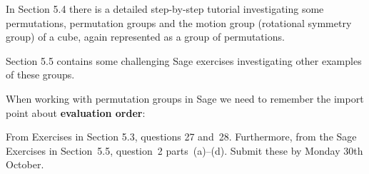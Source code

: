 \documentclass[oneside,10pt]{amsart}
\begin{document}
In Section 5.4 there is a detailed step-by-step tutorial investigating some permutations, permutation groups and the motion group (rotational symmetry group) of a cube, again represented as a group of permutations.

Section 5.5 contains some challenging Sage exercises investigating other examples of these groups.

When working with permutation groups in Sage we need to remember the import point about \textbf{evaluation order}:

\smallskip



From Exercises in Section 5.3, questions 27 and~28.
Furthermore, from the Sage Exercises in Section~5.5, question~2 parts~(a)--(d).
Submit these by Monday 30th October.
\end{document}
